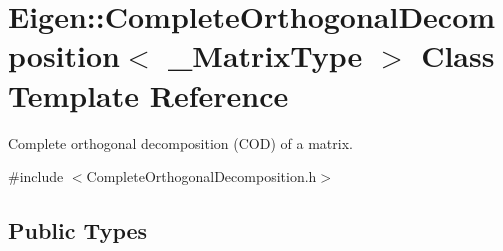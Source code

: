 \hypertarget{class_eigen_1_1_complete_orthogonal_decomposition}{}\section{Eigen\+::Complete\+Orthogonal\+Decomposition$<$ \+\_\+\+Matrix\+Type $>$ Class Template Reference}
\label{class_eigen_1_1_complete_orthogonal_decomposition}


Complete orthogonal decomposition (C\+OD) of a matrix.  




{\ttfamily \#include $<$Complete\+Orthogonal\+Decomposition.\+h$>$}

\subsection*{Public Types}

